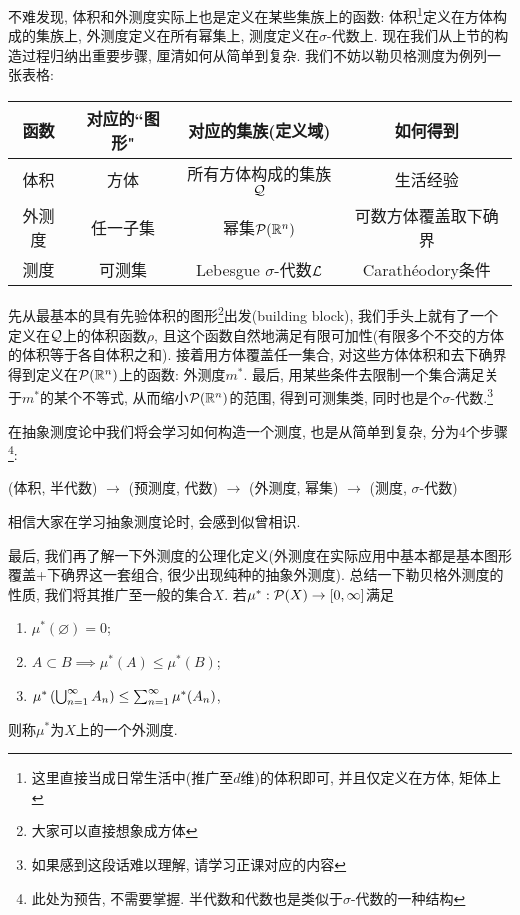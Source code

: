 不难发现, 体积和外测度实际上也是定义在某些集族上的函数:
体积\footnote{这里直接当成日常生活中(推广至$d$维)的体积即可, 并且仅定义在方体, 矩体上}定义在方体构成的集族上, 外测度定义在所有幂集上, 测度定义在$\sigma$-代数上.
现在我们从上节的构造过程归纳出重要步骤, 厘清如何从简单到复杂. 
我们不妨以勒贝格测度为例列一张表格:
\begin{center}
    \begin{tabular}{ |c|c|c|c| } 
    \hline
    函数 & 对应的``图形" & 对应的集族(定义域) & 如何得到 \\ 
    \hline
    体积 & 方体 & 所有方体构成的集族$\mathcal{Q}$  & 生活经验 \\ 
    \hline
    外测度 & 任一子集 & 幂集$\mathcal{P}(\mathbb{R}^n)$ & 可数方体覆盖取下确界 \\ 
    \hline
    测度 & 可测集 & Lebesgue $\sigma$-代数$\mathcal{L}$ & Carath\'eodory条件 \\
    \hline
    \end{tabular}
\end{center}
先从最基本的具有先验体积的图形\footnote{大家可以直接想象成方体}出发(building block), 我们手头上就有了一个定义在$\mathcal{Q}$上的体积函数$\rho$, 且这个函数自然地满足有限可加性(有限多个不交的方体的体积等于各自体积之和). 接着用方体覆盖任一集合, 对这些方体体积和去下确界得到定义在$\mathcal{P}(\mathbb{R}^n)$上的函数: 外测度$m^*$. 最后, 用某些条件去限制一个集合满足关于$m^*$的某个不等式, 从而缩小$\mathcal{P}(\mathbb{R}^n)$的范围, 得到可测集类, 同时也是个$\sigma$-代数.\footnote{如果感到这段话难以理解, 请学习正课对应的内容}

在抽象测度论中我们将会学习如何构造一个测度, 也是从简单到复杂, 分为4个步骤\footnote{此处为预告, 不需要掌握. 半代数和代数也是类似于$\sigma$-代数的一种结构}:
\begin{center}
    (体积, 半代数) $\rightarrow$ (预测度, 代数) $\rightarrow$ (外测度, 幂集) $\rightarrow$ (测度, $\sigma$-代数)
\end{center}
相信大家在学习抽象测度论时, 会感到似曾相识. 

最后, 我们再了解一下外测度的公理化定义(外测度在实际应用中基本都是基本图形覆盖+下确界这一套组合, 很少出现纯种的抽象外测度). 总结一下勒贝格外测度的性质, 我们将其推广至一般的集合$X$. 
若$\mu^*: \mathcal{P}(X) \to [0, \infty]$满足
\begin{enumerate}
    \item $\mu^*(\varnothing) = 0$;
    \item $A \subset B \implies \mu^*(A) \leq \mu^*(B)$;
    \item $\mu^*\left(\bigcup_{n=1}^{\infty}A_n\right) \leq \sum_{n=1}^{\infty} \mu^*(A_n)$,
\end{enumerate}
则称$\mu^*$为$X$上的一个外测度. 

